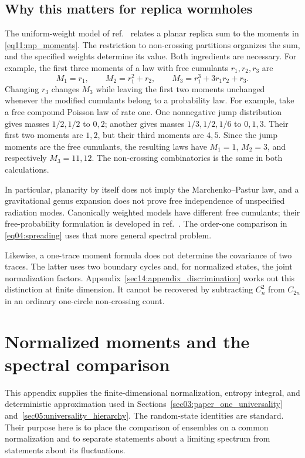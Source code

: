 \documentclass[11pt,letterpaper]{article}
\theoremstyle{plain}
\theoremstyle{definition}
\theoremstyle{remark}
\begin{document}
\subsection{Why this matters for replica wormholes}
\label{subsec11:why_matters}

The uniform-weight model of ref.~\cite{pssyetal2022} relates a planar
replica sum to the moments in \eqref{eq11:mp_moments}. The restriction
to non-crossing partitions organizes the sum, and the specified
weights determine its value. Both ingredients are necessary.
For example, the first three moments of a law with free cumulants
$r_1,r_2,r_3$ are
\begin{equation}
 M_1=r_1,\qquad M_2=r_1^2+r_2,\qquad
 M_3=r_1^3+3r_1r_2+r_3.
 \label{eq11:first_moments}
\end{equation}
Changing $r_3$ changes $M_3$ while leaving the first two moments
unchanged whenever the modified cumulants belong to a probability
law. For example, take a free compound Poisson law of rate one. One
nonnegative jump distribution gives masses $1/2,1/2$ to $0,2$;
another gives masses $1/3,1/2,1/6$ to $0,1,3$. Their first two moments
are $1,2$, but their third moments are $4,5$. Since the jump moments
are the free cumulants, the resulting laws have $M_1=1$, $M_2=3$,
and respectively $M_3=11,12$. The non-crossing combinatorics is the
same in both calculations.

In particular, planarity by itself does not imply the Marchenko--Pastur
law, and a gravitational genus expansion does not prove free
independence of unspecified radiation modes. Canonically weighted
models have different free cumulants; their free-probability
formulation is developed in ref.~\cite{wang2023}. The order-one
comparison in \eqref{eq04:spreading} uses that more general spectral
problem.

Likewise, a one-trace moment formula does not determine the covariance
of two traces. The latter uses two boundary cycles and, for normalized
states, the joint normalization factors. Appendix~\ref{sec14:appendix_discrimination}
works out this distinction at finite dimension. It cannot be recovered
by subtracting $C_n^2$ from $C_{2n}$ in an ordinary one-circle
non-crossing count.

\section{Normalized moments and the spectral comparison}
\label{sec12:appendix_paper_one}

This appendix supplies the finite-dimensional normalization, entropy
integral, and deterministic approximation used in
Sections~\ref{sec03:paper_one_universality}
and~\ref{sec05:universality_hierarchy}.  The random-state identities
are standard.  Their purpose here is to place the comparison of
ensembles on a common normalization and to separate statements about
a limiting spectrum from statements about its fluctuations.
\end{document}
